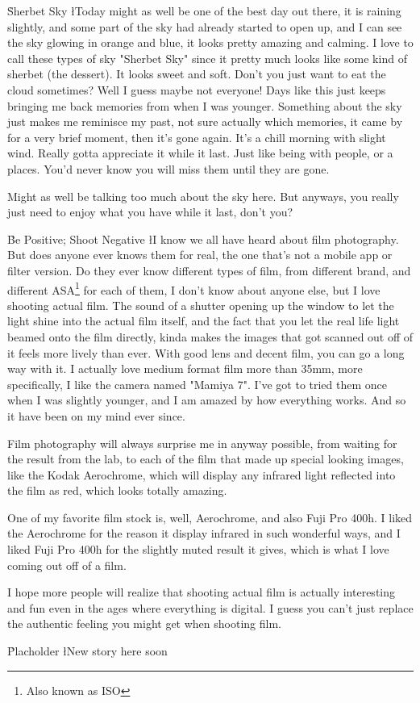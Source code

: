 \documentclass{novella}
\begin{document}
\h{Sherbet Sky}
\l{T}oday might as well be one of the best day out there, it is raining slightly, and some part of the sky had already started to open up, and I can see the sky glowing in orange and blue, it looks pretty amazing and calming. I love to call these types of sky "Sherbet Sky" since it pretty much looks like some kind of sherbet (the dessert). It looks sweet and soft. Don't you just want to eat the cloud sometimes? Well I guess maybe not everyone! Days like this just keeps bringing me back memories from when I was younger. Something about the sky just makes me reminisce my past, not sure actually which memories, it came by for a very brief moment, then it's gone again. It's a chill morning with slight wind. Really gotta appreciate it while it last. Just like being with people, or a places. You'd never know you will miss them until they are gone.

Might as well be talking too much about the sky here. But anyways, you really just need to enjoy what you have while it last, don't you?


\h{Be Positive; Shoot Negative}
\l{I} know we all have heard about film photography. But does anyone ever knows them for real, the one that's not a mobile app or filter version. Do they ever know different types of film, from different brand, and different ASA\footnote{Also known as ISO} for each of them, I don't know about anyone else, but I love shooting actual film. The sound of a shutter opening up the window to let the light shine into the actual film itself, and the fact that you let the real life light beamed onto the film directly, kinda makes the images that got scanned out off of it feels more lively than ever. With good lens and decent film, you can go a long way with it. I actually love medium format film more than 35mm, more specifically, I like the camera named "Mamiya 7". I've got to tried them once when I was slightly younger, and I am amazed by how everything works. And so it have been on my mind ever since.

Film photography will always surprise me in anyway possible, from waiting for the result from the lab, to each of the film that made up special looking images, like the Kodak Aerochrome, which will display any infrared light reflected into the film as red, which looks totally amazing. 


\newpage

One of my favorite film stock is, well, Aerochrome, and also Fuji Pro 400h. I liked the Aerochrome for the reason it display infrared in such wonderful ways, and I liked Fuji Pro 400h for the slightly muted result it gives, which is what I love coming out off of a film.


I hope more people will realize that shooting actual film is actually interesting and fun even in the ages where everything is digital. I guess you can't just replace the authentic feeling you might get when shooting film.

\h{Placholder}
\l{N}ew story here soon
\end{document}
